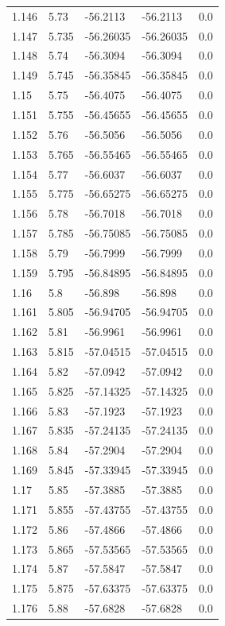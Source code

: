 \begin{tabular}{lllll}
1.146 & 5.73 & -56.2113 & -56.2113 & 0.0 \\
1.147 & 5.735 & -56.26035 & -56.26035 & 0.0 \\
1.148 & 5.74 & -56.3094 & -56.3094 & 0.0 \\
1.149 & 5.745 & -56.35845 & -56.35845 & 0.0 \\
1.15 & 5.75 & -56.4075 & -56.4075 & 0.0 \\
1.151 & 5.755 & -56.45655 & -56.45655 & 0.0 \\
1.152 & 5.76 & -56.5056 & -56.5056 & 0.0 \\
1.153 & 5.765 & -56.55465 & -56.55465 & 0.0 \\
1.154 & 5.77 & -56.6037 & -56.6037 & 0.0 \\
1.155 & 5.775 & -56.65275 & -56.65275 & 0.0 \\
1.156 & 5.78 & -56.7018 & -56.7018 & 0.0 \\
1.157 & 5.785 & -56.75085 & -56.75085 & 0.0 \\
1.158 & 5.79 & -56.7999 & -56.7999 & 0.0 \\
1.159 & 5.795 & -56.84895 & -56.84895 & 0.0 \\
1.16 & 5.8 & -56.898 & -56.898 & 0.0 \\
1.161 & 5.805 & -56.94705 & -56.94705 & 0.0 \\
1.162 & 5.81 & -56.9961 & -56.9961 & 0.0 \\
1.163 & 5.815 & -57.04515 & -57.04515 & 0.0 \\
1.164 & 5.82 & -57.0942 & -57.0942 & 0.0 \\
1.165 & 5.825 & -57.14325 & -57.14325 & 0.0 \\
1.166 & 5.83 & -57.1923 & -57.1923 & 0.0 \\
1.167 & 5.835 & -57.24135 & -57.24135 & 0.0 \\
1.168 & 5.84 & -57.2904 & -57.2904 & 0.0 \\
1.169 & 5.845 & -57.33945 & -57.33945 & 0.0 \\
1.17 & 5.85 & -57.3885 & -57.3885 & 0.0 \\
1.171 & 5.855 & -57.43755 & -57.43755 & 0.0 \\
1.172 & 5.86 & -57.4866 & -57.4866 & 0.0 \\
1.173 & 5.865 & -57.53565 & -57.53565 & 0.0 \\
1.174 & 5.87 & -57.5847 & -57.5847 & 0.0 \\
1.175 & 5.875 & -57.63375 & -57.63375 & 0.0 \\
1.176 & 5.88 & -57.6828 & -57.6828 & 0.0 \\

\end{tabular}
